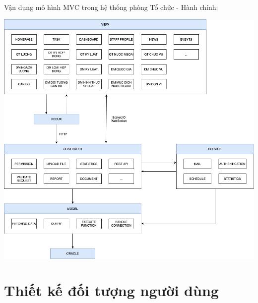 Vận dụng mô hình MVC trong hệ thống phòng Tổ chức - Hành chính:
\begin{center}
  \captionsetup{type=figure}
  \includegraphics[width=15cm]{img/MVCInTchc.png}
\end{center}
\section{Thiết kế đối tượng người dùng}
